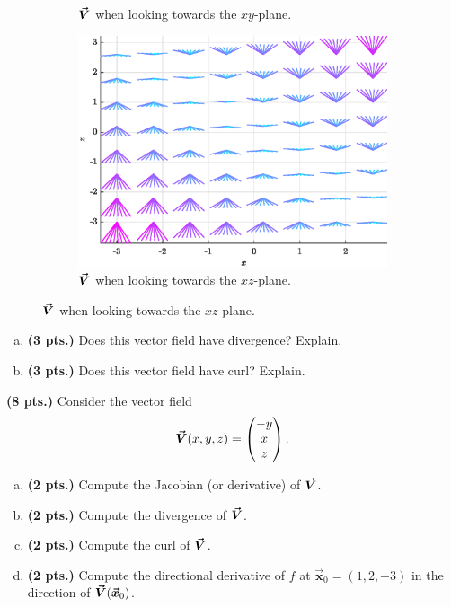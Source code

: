 \documentclass[12pt]{article} %
\newcommand{\vecx}{\boldsymbol{\vec{x}}}
\begin{document}
\begin{problem}
\begin{figure}[H]
\begin{subfigure}[b]{0.45\textwidth}
        \caption{$\boldsymbol{\vec{V}}$ when looking towards the $xy$-plane.}
    \end{subfigure}
    \quad
    \begin{subfigure}[b]{0.45\textwidth}
        \centering
        \includegraphics[width=\textwidth]{figures/vecfield_xz}
        \caption{$\boldsymbol{\vec{V}}$ when looking towards the $xz$-plane.}
    \end{subfigure}
\end{figure}
\begin{enumerate}[(a)]
    \item \textbf{(3 pts.)} Does this vector field have divergence? Explain.
    \item \textbf{(3 pts.)} Does this vector field have curl? Explain.
\end{enumerate}
\end{problem}

\vspace*{0.5cm}

\begin{problem}
\textbf{(8 pts.)} Consider the vector field
\[
\boldsymbol{\vec{V}}(x,y,z) = \begin{pmatrix} -y \\ x \\ z \end{pmatrix}.
\]
\begin{enumerate}[(a)]
    \item \textbf{(2 pts.)} Compute the Jacobian (or derivative) of $\boldsymbol{\vec{V}}$.
    \item \textbf{(2 pts.)} Compute the divergence of $\boldsymbol{\vec{V}}$.
    \item \textbf{(2 pts.)} Compute the curl of $\boldsymbol{\vec{V}}$.
    \item \textbf{(2 pts.)} Compute the directional derivative of $f$ at $\vecx_0 = (1,2,-3)$ in the direction of $\vecfieldV(\vecx_0)$.
\end{enumerate}
\end{problem}
\end{document}
